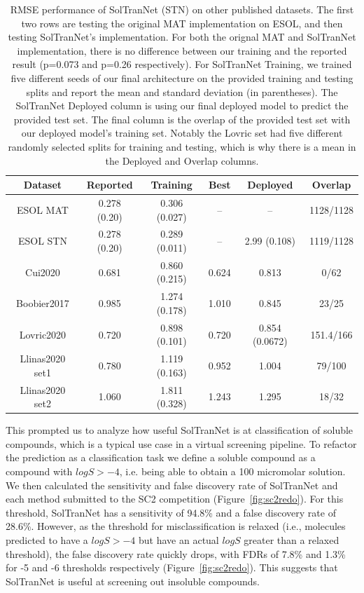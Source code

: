 \documentclass[journal=jcim,manuscript=applicationnotes]{achemso}
\begin{document}
\begin{table}
    \centering
    \begin{tabular}{|c|c|c|c|c|c|}
        \hline
        Dataset &  Reported & Training &  Best & Deployed & Overlap \\
        \hline
        ESOL MAT & 0.278 (0.20) & 0.306 (0.027) & -- & -- & 1128/1128 \\
        ESOL STN & 0.278 (0.20) & 0.289 (0.011) & -- & 2.99 (0.108) & 1119/1128 \\
        \hline
        Cui2020 & 0.681 & 0.860 (0.215) & 0.624 & 0.813 & 0/62 \\
        Boobier2017 & 0.985 & 1.274 (0.178) & 1.010 & 0.845 & 23/25 \\
        Lovric2020 & 0.720 & 0.898 (0.101) & 0.720 & 0.854 (0.0672) & 151.4/166 \\
        Llinas2020 set1 & 0.780 & 1.119 (0.163) & 0.952 & 1.004 & 79/100 \\
        Llinas2020 set2 & 1.060 & 1.811 (0.328) & 1.243 & 1.295 & 18/32 \\
        \hline
    \end{tabular}
    \caption{RMSE performance of SolTranNet (STN) on other published datasets. The first two rows are testing the original MAT implementation on ESOL, and then testing SolTranNet's implementation. For both the orignal MAT and SolTranNet implementation, there is no difference between our training and the reported result (p=0.073 and p=0.26 respectively). For SolTranNet Training, we trained five different seeds of our final architecture on the provided training and testing splits and report the mean and standard deviation (in parentheses). The SolTranNet Deployed column is using our final deployed model to predict the provided test set. The final column is the overlap of the provided test set with our deployed model's training set. Notably the Lovric set had five different randomly selected splits for training and testing, which is why there is a mean in the Deployed and Overlap columns.}
    \label{tab:othersetsrmse}
\end{table}

This prompted us to analyze how useful SolTranNet is at classification of soluble compounds, which is a typical use case in a virtual screening pipeline.
To refactor the prediction as a classification task we define a soluble compound as a compound with $logS > -4$, i.e. being able to obtain a 100 micromolar solution.
We then calculated the sensitivity and false discovery rate of SolTranNet and each method submitted to the SC2 competition (Figure~\ref{fig:sc2redo}).
For this threshold, SolTranNet has a sensitivity of 94.8\% and a false discovery rate of 28.6\%.
However, as the threshold for misclassification is relaxed (i.e., molecules predicted to have a $logS > -4$ but have an actual $logS$ greater than a relaxed threshold), the false discovery rate quickly drops, with FDRs of 7.8\% and 1.3\% for -5 and -6 thresholds respectively (Figure~\ref{fig:sc2redo}).
This suggests that SolTranNet is useful at screening out insoluble compounds.
\end{document}
